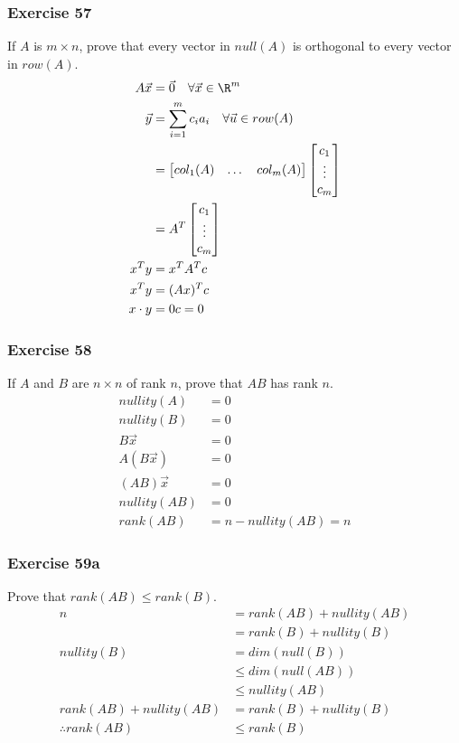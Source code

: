 \documentclass{math}
\begin{document}
\subsubsection*{Exercise 57}
If \( A \) is \( m\times n \), prove that every vector in \( null(A) \) is
orthogonal to every vector in \( row(A) \).
\begin{align*}
  A\vec{x} &= \vec{0} \quad \forall{\vec{x}}\in\R^m \\
  \vec{y} &= \sum_{i=1}^{m}c_ia_i \quad \forall{\vec{u}}\in row(A) \\
  &= \begin{bmatrix}col_1(A) & \dots & col_m(A)\end{bmatrix}
    \begin{bmatrix}c_1 \\ \vdots \\ c_m\end{bmatrix} \\
  &= A^T\begin{bmatrix}c_1 \\ \vdots \\ c_m\end{bmatrix} \\
  x^Ty &= x^TA^Tc \\
  x^Ty &= (Ax)^Tc \\
  x\cdot y
   &= 0c = 0
\end{align*}

\subsubsection*{Exercise 58}
If \( A \) and \( B \) are \( n\times n \) of rank \( n \), prove that \( AB \)
has rank \( n \).
\begin{align*}
  nullity(A) &= 0 \\
  nullity(B) &= 0 \\
  B\vec{x} &= 0 \\
  A(B\vec{x}) &= 0 \\
  (AB)\vec{x} &= 0 \\
  nullity(AB) &= 0 \\
  rank(AB) &= n-nullity(AB) = n
\end{align*}

\subsubsection*{Exercise 59a}
Prove that \( rank(AB)\le rank(B) \).
\begin{align*}
  n &= rank(AB)+nullity(AB) \\
  &= rank(B)+nullity(B) \\
  nullity(B) &= dim(null(B)) \\
  &\le dim(null(AB)) \\
  &\le nullity(AB) \\
  rank(AB)+nullity(AB) &= rank(B)+nullity(B) \\
  \therefore rank(AB) &\le rank(B)
\end{align*}
\end{document}
